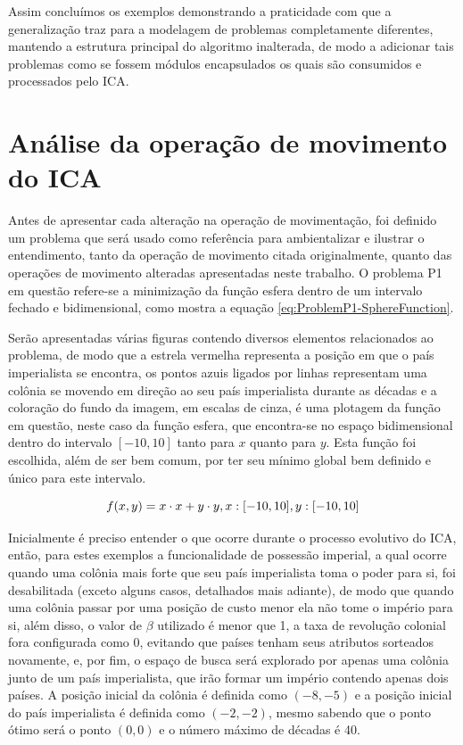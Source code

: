 Assim concluímos os exemplos demonstrando a praticidade com que a generalização traz para a modelagem de problemas completamente diferentes, mantendo a estrutura principal do algoritmo inalterada, de modo a adicionar tais problemas como se fossem módulos encapsulados os quais são consumidos e processados pelo ICA.









\section{Análise da operação de movimento do ICA}

Antes de apresentar cada alteração na operação de movimentação, foi definido um problema que será usado como referência para ambientalizar e ilustrar o entendimento, tanto da operação de movimento citada originalmente, quanto das operações de movimento alteradas apresentadas neste trabalho. O problema P1 em questão refere-se a minimização da função esfera dentro de um intervalo fechado e bidimensional, como mostra a equação \ref{eq:ProblemP1-SphereFunction}.  

Serão apresentadas várias figuras contendo diversos elementos relacionados ao problema, de modo que a estrela vermelha representa a posição em que o país imperialista se encontra, os pontos azuis ligados por linhas representam uma colônia se movendo em direção ao seu país imperialista durante as décadas e a coloração do fundo da imagem, em escalas de cinza, é uma plotagem da função em questão, neste caso da função esfera, que encontra-se no espaço bidimensional dentro do intervalo \(\left[-10, 10\right]\) tanto para \(x\) quanto para \(y\). Esta função foi escolhida, além de ser bem comum, por ter seu mínimo global bem definido e único para este intervalo.

\begin{equation}
f(x,y) = x \cdot x + y \cdot y, \\ x:[-10,10], \\y:[-10,10]
\label{eq:ProblemP1-SphereFunction}
\end{equation}

Inicialmente é preciso entender o que ocorre durante o processo evolutivo do ICA, então, para estes exemplos a funcionalidade de possessão imperial, a qual ocorre quando uma colônia mais forte que seu país imperialista toma o poder para si, foi desabilitada (exceto alguns casos, detalhados mais adiante), de modo que quando uma colônia passar por uma posição de custo menor ela não tome o império para si, além disso, o valor de \(\beta\) utilizado é menor que 1, a taxa de revolução colonial fora configurada como 0, evitando que países tenham seus atributos sorteados novamente, e, por fim, o espaço de busca será explorado por apenas uma colônia junto de um país imperialista, que irão formar um império contendo apenas dois países. A posição inicial da colônia é definida como \((-8,-5)\) e a posição inicial do país imperialista é definida como \((-2,-2)\), mesmo sabendo que o ponto ótimo será o ponto \((0,0)\) e o número máximo de décadas é 40.

